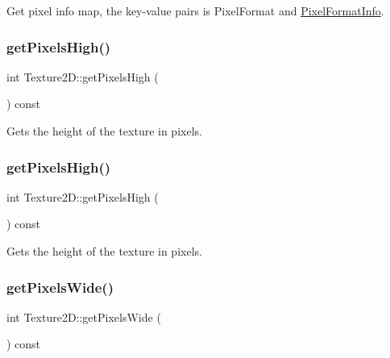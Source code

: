 Get pixel info map, the key-\/value pairs is Pixel\+Format and \hyperlink{structTexture2D_1_1PixelFormatInfo}{Pixel\+Format\+Info}. \mbox{\label{classTexture2D_a380681da07007b979df13ff7855312e5}} 
\subsubsection{\texorpdfstring{get\+Pixels\+High()}{getPixelsHigh()}\hspace{0.1cm}{\footnotesize\ttfamily [1/2]}}
{\footnotesize\ttfamily int Texture2\+D\+::get\+Pixels\+High (\begin{DoxyParamCaption}{ }\end{DoxyParamCaption}) const}

Gets the height of the texture in pixels. \mbox{\label{classTexture2D_a380681da07007b979df13ff7855312e5}} 
\subsubsection{\texorpdfstring{get\+Pixels\+High()}{getPixelsHigh()}\hspace{0.1cm}{\footnotesize\ttfamily [2/2]}}
{\footnotesize\ttfamily int Texture2\+D\+::get\+Pixels\+High (\begin{DoxyParamCaption}{ }\end{DoxyParamCaption}) const}

Gets the height of the texture in pixels. \mbox{\label{classTexture2D_a87918e080c6edb84236e2438c055307b}} 
\subsubsection{\texorpdfstring{get\+Pixels\+Wide()}{getPixelsWide()}\hspace{0.1cm}{\footnotesize\ttfamily [1/2]}}
{\footnotesize\ttfamily int Texture2\+D\+::get\+Pixels\+Wide (\begin{DoxyParamCaption}{ }\end{DoxyParamCaption}) const}

